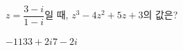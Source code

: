 $z=\dfrac{3-i}{1-i}$일 때, $z^3-4z^2+5z+3$의 값은?
\begin{choices32}{$-1$}{$1$}{$3$}{$3+2i$}{$7-2i$}\end{choices32}
